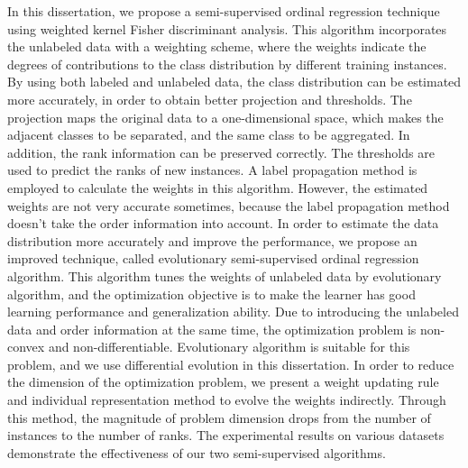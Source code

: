 \begin{enabstract}
In this dissertation, we propose a semi-supervised ordinal regression technique using weighted kernel Fisher discriminant analysis. This algorithm incorporates the unlabeled data with a weighting scheme, where the weights indicate the degrees of contributions to the class distribution by different training instances. By using both labeled and unlabeled data, the class distribution can be estimated more accurately, in order to obtain better projection and thresholds. The projection maps the original data to a one-dimensional space, which makes the adjacent classes to be separated, and the same class to be aggregated. In addition, the rank information can be preserved correctly. The thresholds are used to predict the ranks of new instances. A label propagation method is employed to calculate the weights in this algorithm. However, the estimated weights are not very accurate sometimes, because the label propagation method doesn't take the order information into account. In order to estimate the data distribution more accurately and improve the performance, we propose an improved technique, called evolutionary semi-supervised ordinal regression algorithm. This algorithm tunes the weights of unlabeled data by evolutionary algorithm, and the optimization objective is to make the learner has good learning performance and generalization ability. Due to introducing the unlabeled data and order information at the same time, the optimization problem is non-convex and non-differentiable. Evolutionary algorithm is suitable for this problem, and we use differential evolution in this dissertation. In order to reduce the dimension of the optimization problem, we present a weight updating rule and individual representation method to evolve the weights indirectly. Through this method, the magnitude of problem dimension drops from the number of instances to the number of ranks. The experimental results on various datasets demonstrate the effectiveness of our two semi-supervised algorithms. 


\end{enabstract}
